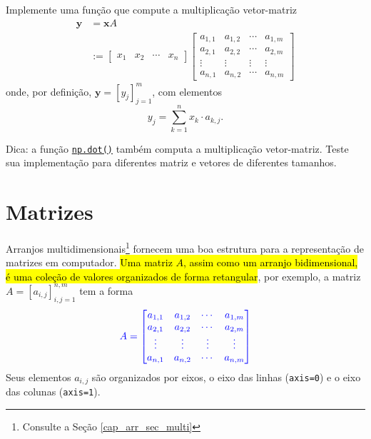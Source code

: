 \begin{exer}
  Implemente uma função que compute a multiplicação vetor-matriz
  \begin{subequations}
    \begin{align}
      \pmb{y} &= \pmb{x}A \\
              &:= \begin{bmatrix}
                x_1 & x_2 & \cdots & x_n
              \end{bmatrix}
                                     \begin{bmatrix}
                                       a_{1,1} & a_{1,2} & \cdots & a_{1,m}\\
                                       a_{2,1} & a_{2,2} & \cdots & a_{2,m}\\
                                       \vdots & \vdots & \vdots & \vdots\\
                                       a_{n,1} & a_{n,2} & \cdots & a_{n,m}
                                     \end{bmatrix}
    \end{align}
  \end{subequations}
  onde, por definição, $\pmb{y} = [y_j]_{j=1}^m$, com elementos
  \begin{equation}
    y_j = \sum_{k=1}^n x_k\cdot a_{k,j}.
  \end{equation}
\end{exer}
\begin{resp}
  Dica: a função \href{https://numpy.org/devdocs/reference/generated/numpy.dot.html}{\lstinline+np.dot()+} também computa a multiplicação vetor-matriz. Teste sua implementação para diferentes matriz e vetores de diferentes tamanhos.
\end{resp}

\section{Matrizes}\label{cap_arr_sec_mat}

Arranjos multidimensionais\footnote{Consulte a Seção \ref{cap_arr_sec_multi}} fornecem uma boa estrutura para a representação de matrizes em computador. \hl{Uma matriz $A$, assim como um arranjo bidimensional, é uma coleção de valores organizados de forma retangular}, por exemplo, a matriz $A = [a_{i,j}]_{i,j=1}^{n,m}$ tem a forma
\begin{equation}\color{blue}A =
  \begin{bmatrix}
    a_{1,1} & a_{1,2} & \cdots & a_{1,m}\\
    a_{2,1} & a_{2,2} & \cdots & a_{2,m}\\
    \vdots & \vdots & \vdots & \vdots\\
    a_{n,1} & a_{n,2} & \cdots & a_{n,m}
  \end{bmatrix}
\end{equation}
Seus elementos $a_{i,j}$ são organizados por eixos, o eixo das linhas (\lstinline+axis=0+) e o eixo das colunas (\lstinline+axis=1+).

